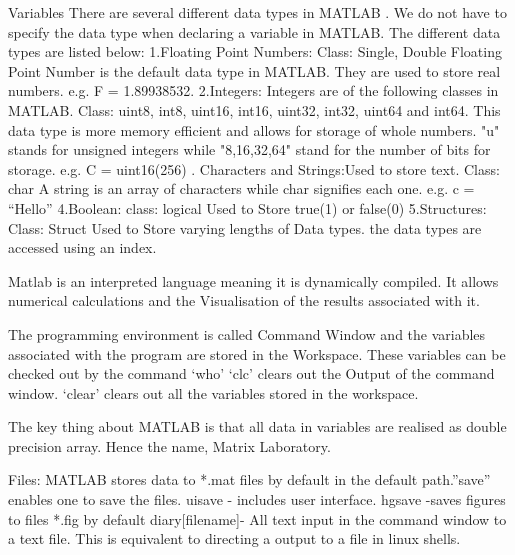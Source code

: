 \documentclass[fleqn,letterpaper,12pt]{report}
\begin{document}
Variables\newline
There are several different data types in MATLAB . We do not have to specify the data type when declaring a variable in MATLAB. 
The different data types are listed below:\newline
1.Floating Point Numbers: \newline
Class: Single, Double\newline
Floating Point Number is the default data type in MATLAB. They are used to store real numbers. e.g. F = 1.89938532. \newline
2.Integers: Integers are of the following classes in MATLAB.  
Class: uint8, int8, uint16, int16, uint32, int32, uint64 and int64.\newline
This data type is more memory efficient and allows for storage of whole numbers. "u" stands for unsigned integers while "8,16,32,64" stand for the number of bits for storage. e.g. C = uint16(256) . Characters and Strings:Used to store text. \newline
Class: char \newline
A string is an array of characters while char signifies each one. e.g. c = “Hello” \newline
4.Boolean: \newline
class: logical \newline
Used to Store true(1) or false(0) \newline
5.Structures: \newline
Class: Struct \newline
Used to Store varying lengths of Data types. the data types are accessed using an index.

Matlab is an interpreted language meaning it is dynamically compiled. It allows numerical calculations and the Visualisation of the results associated with it.

The programming environment is called Command Window and the variables associated with the program are stored in the Workspace. These variables can be checked out by the command ‘who’
‘clc’ clears out the Output of the command window. ‘clear’ clears out all the variables stored in the workspace.

The key thing about MATLAB is that all data in variables are realised as double precision array. Hence the name, Matrix Laboratory.

Files:\newline
MATLAB stores data to *.mat files by default in the default path.”save” enables one to save the files.\newline
uisave - includes user interface.\newline
hgsave -saves figures to files *.fig by default
diary[filename]- All text input in the command window to a text file. This is equivalent to directing a output to a file in linux shells.
\end{document}
